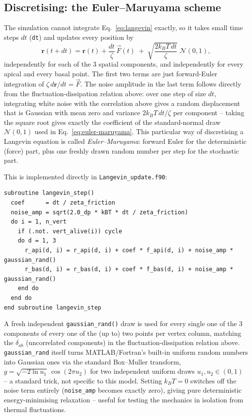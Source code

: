 \documentclass[11pt,a4paper]{report}
\newcommand{\rvec}{\mathbf{r}}
\begin{document}
\subsection{Discretising: the Euler--Maruyama scheme}
The simulation cannot integrate Eq.~\ref{eq:langevin} exactly, so it
takes small time steps $dt$ (\texttt{dt}) and updates every position by
\begin{equation}
  \rvec(t+dt) = \rvec(t) + \frac{dt}{\zeta}\, \vec F(t)
  \;+\; \sqrt{\frac{2k_BT\,dt}{\zeta}}\; \mathcal N(0,1),
  \label{eq:euler-maruyama}
\end{equation}
independently for each of the 3 spatial components, and independently
for every apical and every basal point. The first two terms are just
forward-Euler integration of $\zeta\,d\rvec/dt = \vec F$. The noise
amplitude in the last term follows directly from the
fluctuation-dissipation relation above: over one step of size $dt$,
integrating white noise with the correlation above gives a random
displacement that is Gaussian with mean zero and variance
$2k_BT\,dt/\zeta$ per component -- taking the square root gives exactly
the coefficient of the standard-normal draw $\mathcal N(0,1)$ used in
Eq.~\ref{eq:euler-maruyama}. This particular way of discretising a
Langevin equation is called \emph{Euler--Maruyama}: forward Euler for
the deterministic (force) part, plus one freshly drawn random number
per step for the stochastic part.

This is implemented directly in \texttt{Langevin\_update.f90}:
\begin{lstlisting}
subroutine langevin_step()
  coef      = dt / zeta_friction
  noise_amp = sqrt(2.0_dp * kBT * dt / zeta_friction)
  do i = 1, n_vert
    if (.not. vert_alive(i)) cycle
    do d = 1, 3
      r_api(d, i) = r_api(d, i) + coef * f_api(d, i) + noise_amp * gaussian_rand()
      r_bas(d, i) = r_bas(d, i) + coef * f_bas(d, i) + noise_amp * gaussian_rand()
    end do
  end do
end subroutine langevin_step
\end{lstlisting}
A fresh independent \texttt{gaussian\_rand()} draw is used for every
single one of the 3 components of every one of the (up to) two points
per vertex column, matching the $\delta_{ab}$ (uncorrelated components)
in the fluctuation-dissipation relation above. \texttt{gaussian\_rand}
itself turns MATLAB/Fortran's built-in uniform random numbers into
Gaussian ones via the standard Box--Muller transform,
$g=\sqrt{-2\ln u_1}\,\cos(2\pi u_2)$ for two independent uniform
draws $u_1,u_2\in(0,1)$ -- a standard trick, not specific to this
model. Setting $k_BT=0$ switches off the noise term entirely
(\texttt{noise\_amp} becomes exactly zero), giving pure deterministic
energy-minimising relaxation -- useful for testing the mechanics in
isolation from thermal fluctuations.
\end{document}
